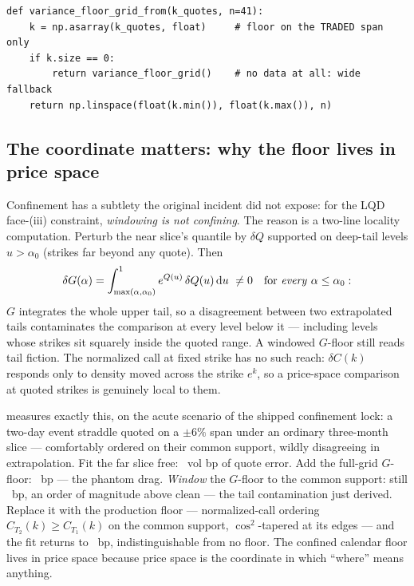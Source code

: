 \documentclass[11pt]{article}
\begin{document}
\begin{lstlisting}[caption={The confinement fix (verified against
production to \calmrefagree, \cref{app:ref}).},label={lst:confine}]
def variance_floor_grid_from(k_quotes, n=41):
    k = np.asarray(k_quotes, float)     # floor on the TRADED span only
    if k.size == 0:
        return variance_floor_grid()    # no data at all: wide fallback
    return np.linspace(float(k.min()), float(k.max()), n)
\end{lstlisting}

\subsection{The coordinate matters: why the floor lives in price space}
\label{sec:coordinate}

Confinement has a subtlety the original incident did not expose: for
the LQD face-(iii) constraint, \emph{windowing is not confining}.  The
reason is a two-line locality computation.  Perturb the near slice's
quantile by $\delta Q$ supported on deep-tail levels $u>\alpha_0$
(strikes far beyond any quote).  Then
\[
\delta G(\alpha)=\int_{\max(\alpha,\alpha_0)}^{1}
e^{Q(u)}\,\delta Q(u)\,\mathrm{d} u
\ \ne0\quad\text{for \emph{every} }\alpha\le\alpha_0 :
\]
$G$ integrates the whole upper tail, so a disagreement between two
extrapolated tails contaminates the comparison at every level below it
--- including levels whose strikes sit squarely inside the quoted
range.  A windowed $G$-floor still reads tail fiction.  The normalized
call at fixed strike has no such reach: $\delta C(k)$ responds only to
density moved across the strike $e^{k}$, so a price-space comparison at
quoted strikes is genuinely local to them.

 measures exactly this, on the acute scenario of the
shipped confinement lock: a two-day event straddle quoted on a
$\pm6\%$ span under an ordinary three-month slice --- comfortably
ordered on their common support, wildly disagreeing in extrapolation.
Fit the far slice free: \calmdragfreebp\ vol bp of quote error.  Add
the full-grid $G$-floor: \calmdragfullbp\ bp --- the phantom drag.
\emph{Window} the $G$-floor to the common support: still
\calmdragwinbp\ bp, an order of magnitude above clean --- the tail
contamination just derived.  Replace it with the production floor ---
normalized-call ordering $C_{T_2}(k)\ge C_{T_1}(k)$ on the common
support, $\cos^{2}$-tapered at its edges --- and the fit returns to
\calmdragpricebp\ bp, indistinguishable from no floor.  The confined
calendar floor lives in price space because price space is the
coordinate in which ``where'' means anything.
\end{document}
